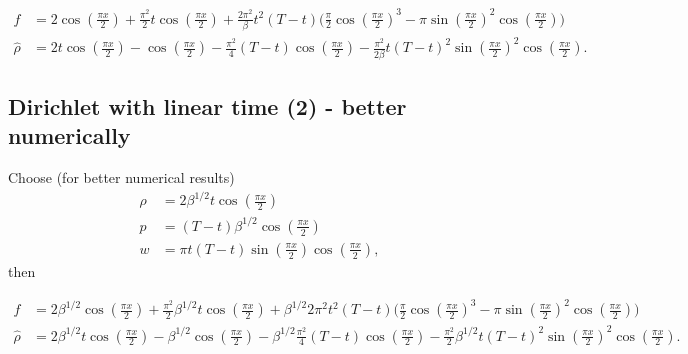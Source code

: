 \documentclass[11pt, a4paper]{article}
\theoremstyle{definition}
\begin{document}
\begin{align*}
f & = 2 \cos(\frac{\pi x}{2}) + \frac{\pi^2}{2}t \cos(\frac{\pi x}{2}) + \frac{2\pi^2}{\beta} t^2 (T-t) \bigg(\frac{\pi}{2}\cos(\frac{\pi x}{2})^3 - \pi \sin(\frac{\pi x}{2})^2 \cos(\frac{\pi x}{2})\bigg)\\
\hat \rho &=2 t \cos(\frac{\pi x}{2}) - \cos(\frac{\pi x}{2}) - \frac{\pi^2}{4}(T-t) \cos(\frac{\pi x}{2}) - \frac{\pi^2}{2 \beta}t (T-t)^2 \sin(\frac{\pi x}{2})^2 \cos(\frac{\pi x}{2}).
\end{align*}


\subsection*{Dirichlet with linear time (2) - better numerically}
Choose (for better numerical results)
\begin{align*}
\rho &= 2 \beta^{1/2}t \cos(\frac{\pi x}{2}) \\
p &= (T-t) \beta^{1/2}\cos(\frac{\pi x}{2})\\
w &= \pi t (T-t) \sin(\frac{\pi x}{2})\cos(\frac{\pi x}{2}),
\end{align*}
then

\begin{align*}
f & = 2\beta^{1/2} \cos(\frac{\pi x}{2}) + \frac{\pi^2}{2}\beta^{1/2}t \cos(\frac{\pi x}{2}) + \beta^{1/2}2\pi^2 t^2 (T-t) \bigg(\frac{\pi}{2}\cos(\frac{\pi x}{2})^3 - \pi \sin(\frac{\pi x}{2})^2 \cos(\frac{\pi x}{2})\bigg)\\
\hat \rho &=2 \beta^{1/2}t \cos(\frac{\pi x}{2}) - \beta^{1/2}\cos(\frac{\pi x}{2}) - \beta^{1/2}\frac{\pi^2}{4}(T-t) \cos(\frac{\pi x}{2}) - \frac{\pi^2}{2}\beta^{1/2}t (T-t)^2 \sin(\frac{\pi x}{2})^2 \cos(\frac{\pi x}{2}).
\end{align*}
\end{document}
